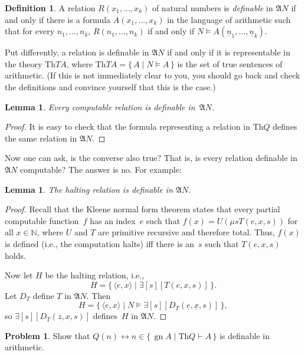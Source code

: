\documentclass[10pt,a4paper]{article}
\theoremstyle{plain}
\newtheorem{lem}[thm]{Lemma}
\theoremstyle{definition}
\newtheorem{defn}[thm]{Definition}
\newtheorem{prob}{Problem}[section]
\theoremstyle{remark}
\providecommand{\lexists}{\mathord{\exists}}
\providecommand{\Proves}{\mathrel{\vdash}}
\providecommand{\Struct}{\ensuremath{\mathfrak{A}}}
\providecommand{\Sat}[2]{\ensuremath{#1 \models #2}}
\providecommand{\Th}{\ensuremath{\mathrm{Th}}}
\providecommand{\tuple}[1]{\langle #1 \rangle}
\providecommand{\num}[1]{\underline{#1}}
\providecommand{\Nat}{\ensuremath{\mathbb{N}}}
\providecommand{\Setabs}[2]{\{\, #1 \mid #2 \,\}}
\providecommand{\Gn}{\operatorname{gn}}
\providecommand{\umin}{\mu}
\providecommand{\defiff}{\mathrel{\leftrightarrow}}
\begin{document}
\begin{defn}
A relation $R(x_1,\dots,x_k)$ of natural numbers is \emph{definable}
in $\Struct{N}$ if and only if there is a formula $A(x_1,\dots,x_k)$
in the language of arithmetic such that for every $n_1,\dots,n_k$,
$R(n_1,\dots,n_k)$ if and only if $\Sat{N}{A(\num n_1,\dots,\num
  n_k)}$.
\end{defn}

Put differently, a relation is definable in $\Struct{N}$ if and
only if it is representable in the theory $\Th{TA}$, where $\Th{TA} =
\Setabs{A}{\Sat{N}{A}}$ is the set of true sentences of
arithmetic. (If this is not immediately clear to you, you should go
back and check the definitions and convince yourself that this is the
case.)

\begin{lem}
Every computable relation is definable in~$\Struct{N}$.
\end{lem}

\begin{proof}
It is easy to check that the formula representing a relation in
$\Th{Q}$ defines the same relation in $\Struct{N}$. 
\end{proof}

Now one can ask, is the converse also true?  That is, is every
relation definable in~$\Struct{N}$ computable? The answer is no. For
example:

\begin{lem}
The halting relation is definable in $\Struct{N}$.
\end{lem}

\begin{proof}
Recall that the Kleene normal form theorem states that every partial
computable function~$f$ has an index~$e$ such that $f(x) =
U(\umin{s}{T(e,x,s)})$ for all $x \in \Nat$, where $U$ and $T$ are
primitive recursive and therefore total. Thus, $f(x)$ is defined
(i.e., the computation halts) iff there is an~$s$ such that $T(e,x,s)$
holds.

Now let $H$ be the halting relation, i.e.,
\[
H = \Setabs{\tuple{e,x}}{\lexists[s][T(e, x, s)]}.
\]
Let $D_T$ define $T$ in $\Struct{N}$. Then
\[
H = \Setabs{\tuple{e,x}}{\Sat{N}{\lexists[s][D_T(\num e, \num x, s)]}},
\]
so $\lexists[s][D_T(z, x, s)]$ defines~$H$ in $\Struct{N}$. 
\end{proof}

\begin{prob}
Show that $Q(n) \defiff n \in \Setabs{\Gn{A}}{\Th{Q} \Proves A}$ is
  definable in arithmetic.
\end{prob}
\end{document}
